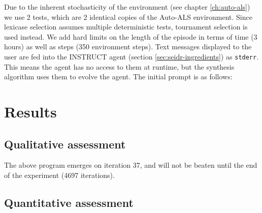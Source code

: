 Due to the inherent stochasticity of the environment (see chapter \ref{ch:auto-als}) we use 2 tests, which are 2 identical copies of the Auto-ALS environment.
Since lexicase selection assumes multiple deterministic tests, tournament selection is used instead.
We add hard limits on the length of the episode in terms of time (3 hours) as well as steps (350 environment steps).
Text messages displayed to the user are fed into the INSTRUCT agent (section \ref{sec:seidr-ingredients}) as \texttt{stderr}.
This means the agent has no access to them at runtime, but the synthesis algorithm uses them to evolve the agent.
The initial prompt is as follows:



\newpage
\section{Results}

\subsection{Qualitative assessment}



The above program emerges on iteration 37, and will not be beaten until the end of the experiment (4697 iterations).

\newpage
\subsection{Quantitative assessment}

